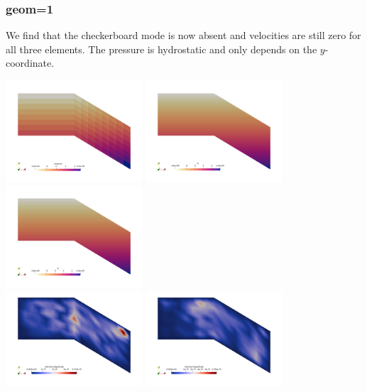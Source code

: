 \subsubsection*{geom=1}

We find that the checkerboard mode is now absent and velocities are still zero
for all three elements. The pressure is hydrostatic and only depends on the $y$-coordinate.

\begin{center}
\includegraphics[width=5.1cm]{python_codes/fieldstone_42/results/geom1/press1}
\includegraphics[width=5.1cm]{python_codes/fieldstone_42/results/geom1/press2}
\includegraphics[width=5.1cm]{python_codes/fieldstone_42/results/geom1/press3}\\
\includegraphics[width=5.1cm]{python_codes/fieldstone_42/results/geom1/vel1}
\includegraphics[width=5.1cm]{python_codes/fieldstone_42/results/geom1/vel2}

\end{center}
